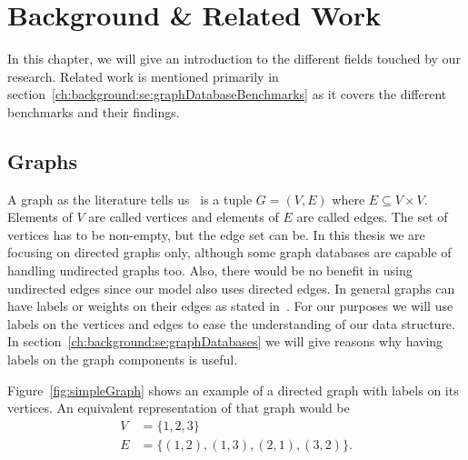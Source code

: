 \chapter{Background \& Related Work}
\label{ch:background}
In this chapter,
we will give an introduction to the different fields touched by our research.
Related work is mentioned primarily in section~\ref{ch:background:se:graphDatabaseBenchmarks} as it covers the different benchmarks and their findings.

\section{Graphs}
\label{ch:background:se:graphs}
A graph as the literature tells us~\cite[89]{Worsch2011} is a tuple $ G = (V, E) $ where $ E \subseteq V \times V $.
Elements of $ V $ are called vertices and elements of $ E $ are called edges.
The set of vertices has to be non-empty,
but the edge set can be.
In this thesis we are focusing on directed graphs only,
although some graph databases are capable of handling undirected graphs too.
Also,
there would be no benefit in using undirected edges since our model also uses directed edges.
In general graphs can have labels or weights on their edges as stated in~\cite[99]{Worsch2011}.
For our purposes we will use labels on the vertices and edges to ease the understanding of our data structure.
In section~\ref{ch:background:se:graphDatabases} we will give reasons why having labels on the graph components is useful.

Figure~\ref{fig:simpleGraph} shows an example of a directed graph with labels on its vertices.
An equivalent representation of that graph would be
\begin{equation}
  \begin{aligned}
    V &= \{1, 2, 3\} \\
    E &= \{(1, 2), (1, 3), (2, 1), (3, 2)\}.
  \end{aligned}
\end{equation}

